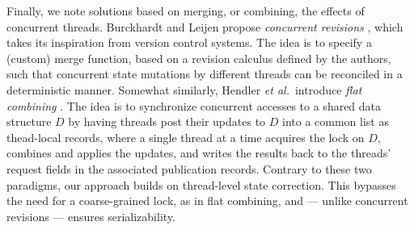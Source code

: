 Finally, we note solutions based on merging, or combining, the effects of concurrent threads. Burckhardt and Leijen propose \emph{concurrent revisions} \cite{ConcRevisionsSPAA}, which takes its inspiration from version control systems. The idea is to specify a (custom) merge function, based on a revision calculus defined by the authors, such that concurrent state mutations by different threads can be reconciled in a deterministic manner. Somewhat similarly, Hendler \emph{et al.}~introduce \emph{flat combining} \cite{FlatCombiningSPAA}. The idea is to synchronize concurrent accesses to a shared data structure $D$ by having threads post their updates to $D$ into a common list as thead-local records, where a single thread at a time acquires the lock on $D$, combines and applies the updates, and writes the results back to the threads' request fields in the associated publication records. Contrary to these two paradigms, our approach builds on thread-level state correction. This bypasses the need for a coarse-grained lock, as in flat combining, and --- unlike concurrent revisions --- ensures serializability. 






